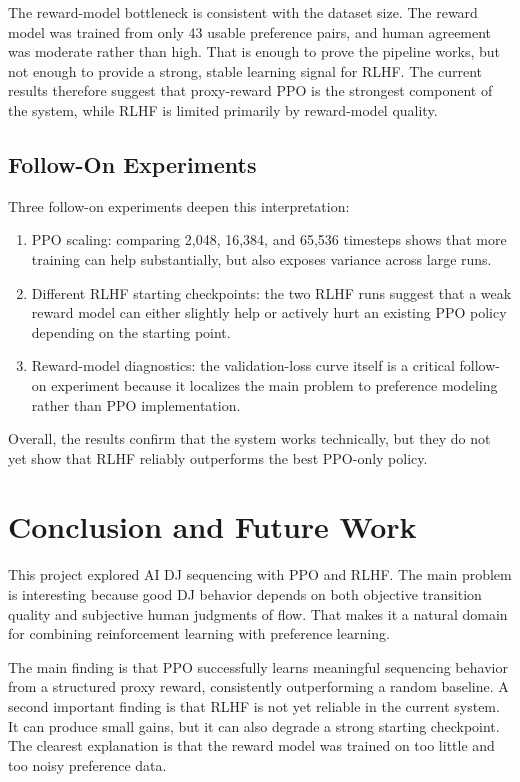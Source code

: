\documentclass{article}
\begin{document}
The reward-model bottleneck is consistent with the dataset size. The reward model was trained from only 43 usable preference pairs, and human agreement was moderate rather than high. That is enough to prove the pipeline works, but not enough to provide a strong, stable learning signal for RLHF. The current results therefore suggest that proxy-reward PPO is the strongest component of the system, while RLHF is limited primarily by reward-model quality.

\subsection{Follow-On Experiments}

Three follow-on experiments deepen this interpretation:
\begin{enumerate}
\item PPO scaling: comparing 2,048, 16,384, and 65,536 timesteps shows that more training can help substantially, but also exposes variance across large runs.
\item Different RLHF starting checkpoints: the two RLHF runs suggest that a weak reward model can either slightly help or actively hurt an existing PPO policy depending on the starting point.
\item Reward-model diagnostics: the validation-loss curve itself is a critical follow-on experiment because it localizes the main problem to preference modeling rather than PPO implementation.
\end{enumerate}

Overall, the results confirm that the system works technically, but they do not yet show that RLHF reliably outperforms the best PPO-only policy.

\section{Conclusion and Future Work}

This project explored AI DJ sequencing with PPO and RLHF. The main problem is interesting because good DJ behavior depends on both objective transition quality and subjective human judgments of flow. That makes it a natural domain for combining reinforcement learning with preference learning.

The main finding is that PPO successfully learns meaningful sequencing behavior from a structured proxy reward, consistently outperforming a random baseline. A second important finding is that RLHF is not yet reliable in the current system. It can produce small gains, but it can also degrade a strong starting checkpoint. The clearest explanation is that the reward model was trained on too little and too noisy preference data.
\end{document}
